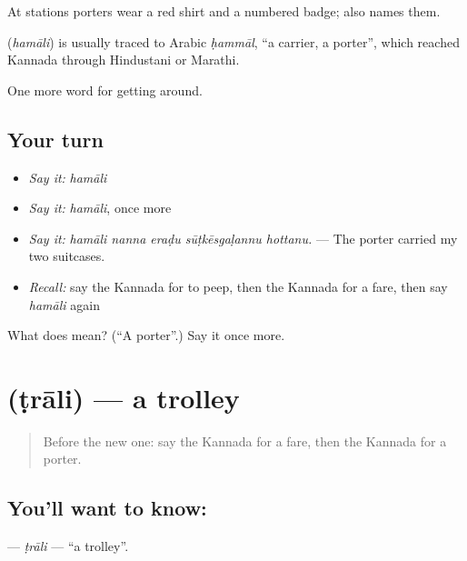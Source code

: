 At stations porters wear a red shirt and a numbered badge;  also names them.

\begin{cousinweb}
\textbf{} (\emph{hamāli}) is usually traced to Arabic \emph{ḥammāl}, \textquotedblleft{}a carrier, a porter\textquotedblright{}, which reached Kannada through Hindustani or Marathi.
\end{cousinweb}

\begin{grammarlens}[title={What you've built}]
One more word for getting around.
\end{grammarlens}

\subsection*{Your turn}
\begin{itemize}
\raggedright
  \item \emph{Say it:} \emph{hamāli}
  \item \emph{Say it:} \emph{hamāli}, once more
  \item \emph{Say it:} \emph{hamāli nanna eraḍu sūṭkēsgaḷannu hottanu.} — The porter carried my two suitcases.
  \item \emph{Recall:} say the Kannada for to peep, then the Kannada for a fare, then say \emph{hamāli} again
\end{itemize}

\begin{tcolorbox}[breakable,colback=teal!4,colframe=teal!35!black,title={Before you move on}]
What does  mean? (\textquotedblleft{}A porter\textquotedblright{}.) Say it once more.
\end{tcolorbox}
\section[\texorpdfstring{\kn{ಟ್ರಾಲಿ} (ṭrāli)}{ಟ್ರಾಲಿ (ṭrāli)}]{ (ṭrāli) — a trolley}

\label{lesson:KA-C436-trali}



\begin{quote}
Before the new one: say the Kannada for a fare, then the Kannada for a porter.
\end{quote}

\subsection*{You'll want to know: }
\textbf{} — \emph{ṭrāli} — \textquotedblleft{}a trolley\textquotedblright{}.

